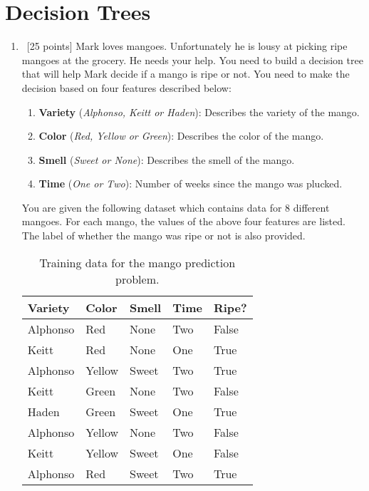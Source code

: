 \section{Decision Trees}
\label{sec:decision-trees}

\begin{enumerate}


\item~[25 points] 
  Mark loves mangoes. Unfortunately he is lousy at picking ripe mangoes at the grocery. He needs your help.
  You need to build a decision tree that will help Mark decide if a mango is ripe or not. You need to make the decision based on
  four features described below:
  \begin{enumerate}
  \item\textbf{Variety} (\textit{Alphonso, Keitt or Haden}): Describes the variety of the mango.
  \item\textbf{Color} (\textit{Red, Yellow or Green}): Describes the color of the mango.
  \item\textbf{Smell} (\textit{Sweet or None}): Describes the smell of the mango.
  \item\textbf{Time} (\textit{One or Two}): Number of weeks since the mango was plucked.
  \end{enumerate}

  You are given the following dataset which contains data for 8 different mangoes. For each mango, the values of the above four features
  are listed. The label of whether the mango was ripe or not is also provided.

  \begin{table}[h]
    \centering
    \begin{tabular}{llll|l}
      \hline
      Variety & Color    & Smell  & Time & Ripe?  \\ \hline
      Alphonso& Red      & None   & Two  & False  \\
      Keitt   & Red      & None   & One  & True   \\
      Alphonso& Yellow   & Sweet  & Two  & True   \\
      Keitt   & Green    & None   & Two  & False  \\
      Haden   & Green    & Sweet  & One  & True   \\
      Alphonso& Yellow   & None   & Two  & False  \\
      Keitt   & Yellow   & Sweet  & One  & False  \\
      Alphonso& Red      & Sweet  & Two  & True   \\ \hline
    \end{tabular}
    \caption{Training data for the mango prediction problem.}\label{tb-mango-train}
  \end{table}



\end{enumerate}
